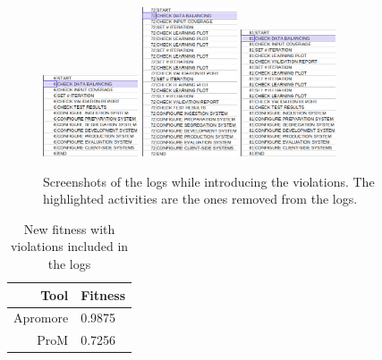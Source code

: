 \begin{figure}[H]
\includegraphics[width=0.25\textwidth]{figures/violations/6.png}
\includegraphics[width=0.25\textwidth]{figures/violations/72.png}
\includegraphics[width=0.25\textwidth]{figures/violations/81.png}
\caption{Screenshots of the logs while introducing the violations. 
The highlighted activities are the ones removed from the logs.}
\label{fig:introducing_violations}
\end{figure}


\begin{table}[H]
\centering
\begin{tabular}{|r|l|}
\hline
\textbf{Tool} & \textbf{Fitness} \\
\hline
Apromore & 0.9875 \\
\hline
ProM & 0.7256 \\
\hline
\end{tabular}
\caption{New fitness with violations included in the logs}
\label{tab:violations_fitness}
\end{table}

